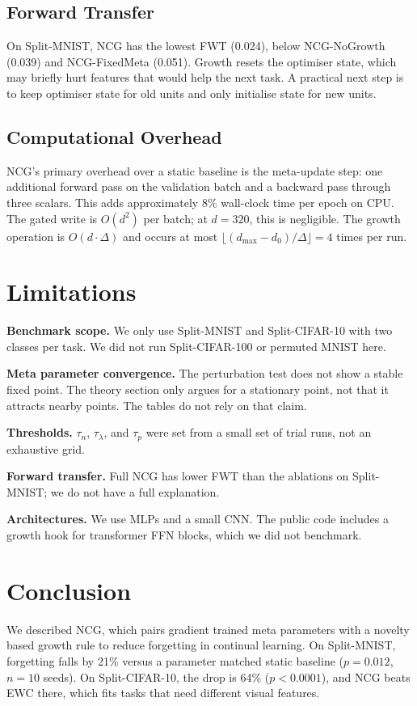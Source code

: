 \documentclass[conference]{IEEEtran}
\begin{document}
\subsection{Forward Transfer}
On Split-MNIST, NCG has the lowest FWT (0.024), below NCG-NoGrowth (0.039) and NCG-FixedMeta (0.051). Growth resets the optimiser state, which may briefly hurt features that would help the next task. A practical next step is to keep optimiser state for old units and only initialise state for new units.

\subsection{Computational Overhead}
NCG's primary overhead over a static baseline is the meta-update step: one additional forward pass on the validation batch and a backward pass through three scalars. This adds approximately 8\% wall-clock time per epoch on CPU. The gated write is $O(d^2)$ per batch; at $d = 320$, this is negligible. The growth operation is $O(d \cdot \Delta)$ and occurs at most $\lfloor (d_{\max} - d_0)/\Delta \rfloor = 4$ times per run.

\section{Limitations}
\textbf{Benchmark scope.} We only use Split-MNIST and Split-CIFAR-10 with two classes per task. We did not run Split-CIFAR-100 or permuted MNIST here.

\textbf{Meta parameter convergence.} The perturbation test does not show a stable fixed point. The theory section only argues for a stationary point, not that it attracts nearby points. The tables do not rely on that claim.

\textbf{Thresholds.} $\tau_n$, $\tau_{\lambda}$, and $\tau_p$ were set from a small set of trial runs, not an exhaustive grid.

\textbf{Forward transfer.} Full NCG has lower FWT than the ablations on Split-MNIST; we do not have a full explanation.

\textbf{Architectures.} We use MLPs and a small CNN. The public code includes a growth hook for transformer FFN blocks, which we did not benchmark.

\section{Conclusion}
We described NCG, which pairs gradient trained meta parameters with a novelty based growth rule to reduce forgetting in continual learning. On Split-MNIST, forgetting falls by 21\% versus a parameter matched static baseline ($p = 0.012$, $n = 10$ seeds). On Split-CIFAR-10, the drop is 64\% ($p < 0.0001$), and NCG beats EWC there, which fits tasks that need different visual features.
\end{document}
